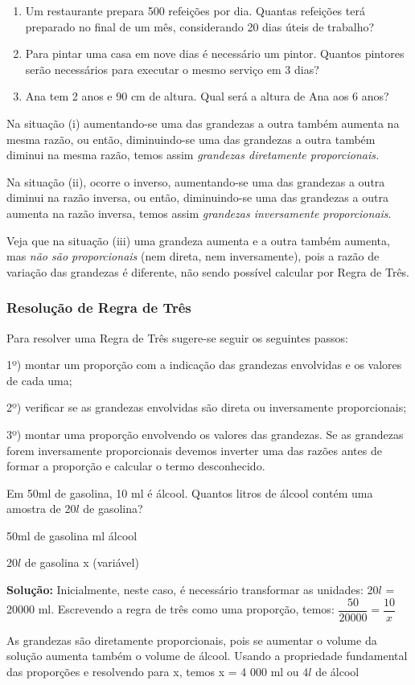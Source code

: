 \begin{enumerate}[label=(\roman*)]
	\item Um restaurante prepara 500 refeições por dia. Quantas refeições terá preparado no final de um mês, considerando 20 dias úteis de trabalho?

	\item Para pintar uma casa em nove dias é necessário um pintor. Quantos pintores serão necessários para executar o mesmo serviço em 3 dias?

	\item  Ana tem 2 anos e 90 cm de altura. Qual será a altura de Ana aos 6 anos?
\end{enumerate}

Na situação (i) aumentando-se uma das grandezas a outra também aumenta na mesma razão, ou então, diminuindo-se uma das grandezas a outra também diminui na mesma razão, temos assim \textit{grandezas diretamente proporcionais.}

Na situação (ii), ocorre o inverso, aumentando-se uma das grandezas a outra diminui na razão inversa, ou então, diminuindo-se uma das grandezas a outra aumenta na razão inversa, temos assim \textit{grandezas inversamente proporcionais}.

Veja que na situação (iii) uma grandeza aumenta e a outra também aumenta, mas \textit{não são proporcionais} (nem direta, nem inversamente), pois a razão de variação das grandezas é diferente, não sendo possível calcular por Regra de Três.


\subsubsection{Resolução de Regra de Três}
	Para resolver uma Regra de Três sugere-se seguir os seguintes passos:

1º) montar um proporção com a indicação das grandezas envolvidas e os valores de cada uma;

2º) verificar se as grandezas envolvidas são direta ou inversamente proporcionais;

3º) montar uma proporção envolvendo os valores das grandezas. Se as grandezas forem inversamente proporcionais devemos inverter uma das razões antes de formar a proporção e calcular o termo desconhecido.

\begin{texemplo}
Em  50ml de gasolina, 10 ml é álcool. Quantos litros de álcool contém uma amostra de  20$l$ de gasolina?

50ml de gasolina \quad \quad \quad {} ml álcool

20$l$ de gasolina \quad \quad \quad \quad x (variável)

\textbf{Solução:} Inicialmente, neste caso, é necessário transformar as unidades: 20$l$ = 20000 ml. Escrevendo a regra de três como uma proporção, temos:
$\dfrac{50}{20000}=\dfrac{10}{x}$ 

As grandezas são diretamente proporcionais, pois se aumentar o volume da solução aumenta também o volume de álcool. 
Usando a propriedade fundamental das proporções e resolvendo para x, temos x = 4 000 ml  ou 4$l$  de álcool \qedsymbol{}
\end{texemplo}

